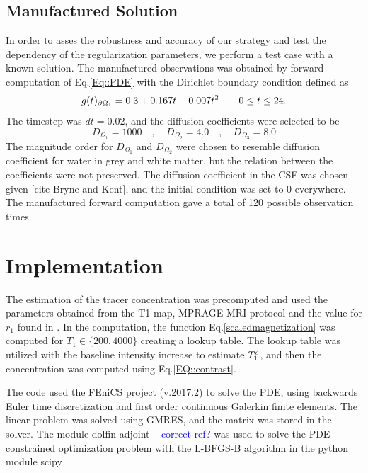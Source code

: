 \documentclass[11pt,a4paper]{article}
\newcommand{\kam}[1]{\textcolor{blue}{#1}}
\begin{document}
\subsection{Manufactured Solution}
In order to asses the robustness and accuracy of our strategy and test the dependency of the
regularization parameters, we perform a test case with a
known solution.  
The manufactured observations was obtained by forward computation of Eq.\ref{Eq::PDE} with the Dirichlet boundary condition defined as
\begin{equation}
g(t)_{\partial \Omega_1} = 0.3 +0.167t - 0.007t\sp{2} \qquad  0 \leq t \leq 24.
\label{EQ::DIRI}
\end{equation}
The timestep was $dt = 0.02$, and the diffusion coefficients were selected to be 
\begin{equation}
D_{\Omega_1} = 1000 \quad , \quad D_{\Omega_2} = 4.0 \quad , \quad D_{\Omega_3} = 8.0 
\end{equation}  
The magnitude order for $D_{\Omega_1} $ and $D_{\Omega_2}$ were chosen to resemble diffusion coefficient for water in grey and white matter, but the relation between the coefficients were not preserved. The diffusion coefficient in the CSF was chosen given [cite Bryne and Kent], and the initial condition was set to 0 everywhere. %
The manufactured forward computation gave a total of 120 possible observation times.


\section{Implementation}
The estimation of the tracer concentration was precomputed and used the parameters obtained from the T1 map, MPRAGE MRI protocol \cite{eidevalnes} and the value for $r_1$ found in \cite{pmid16230904}. In the computation, the function Eq.\ref{scaledmagnetization} was computed for $ T_1\in \lbrace 200, 4000 \rbrace$ creating a lookup table. The lookup table was utilized with the baseline intensity increase to estimate $T_1\sp{c}$, and then the concentration was computed using Eq.\ref{EQ::contrast}.  


The code used the FEniCS project (v.2017.2)  to solve the PDE, using backwards Euler time discretization and first order continuous Galerkin finite elements. The linear problem was solved using GMRES, and the matrix was stored in the solver. 
The module dolfin adjoint ~\cite{farrell2013automated} \kam{correct ref?}  was used to solve the PDE constrained optimization problem with the L-BFGS-B algorithm in the python module scipy \cite{LBFGSB1, LBFGSB2}. 
\end{document}
